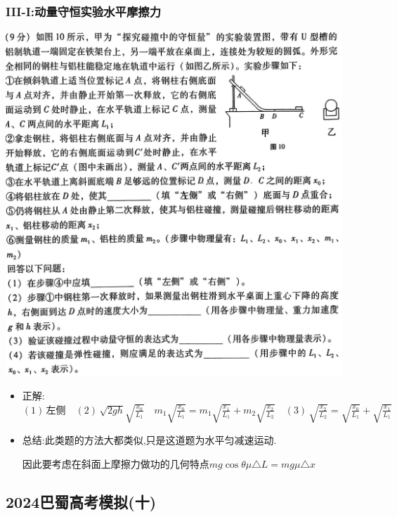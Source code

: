 \documentclass{article}
\begin{document}
\subsubsection{III-I:动量守恒实验水平摩擦力}

\includegraphics[width=0.95\textwidth,keepaspectratio]{./pictures/3.9-1.png}

\begin{itemize}
    \item 正解:\quad $(1) \, \text{左侧} \quad (2) \, \sqrt{2gh}\sqrt{\frac{x_{0}}{L_{1}}} \quad
              m_{1}\sqrt{\frac{x_{0}}{L_{1}}} = m_{1} \sqrt{\frac{x_{1}}{L_{1}}} + m_{2}\sqrt{\frac{x_{2}}{L_{2}}} \quad (3) \,
              \sqrt{\frac{x_{2}}{L_{2}}} = \sqrt{\frac{x_{0}}{L_{1}}} + \sqrt{\frac{x_{1}}{L_{1}}}$
    \item 总结:\quad 此类题的方法大都类似,只是这道题为水平匀减速运动.

          \hspace{3.2em}因此要考虑在斜面上摩擦力做功的几何特点$ mg \cos{\theta} \mu \triangle L = mg\mu \triangle x $
\end{itemize}

\vspace{2em}

\subsection{2024巴蜀高考模拟(十)}
\end{document}
